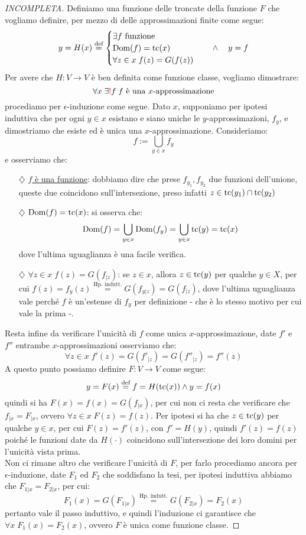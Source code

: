 \begin{proof}[INCOMPLETA]
	Definiamo una funzione delle troncate della funzione $F$ che vogliamo definire, per mezzo di delle approssimazioni finite come segue:
	\[ y = H(x) \overset{\text{def}}{=} \begin{cases}
		\text{$\exists f$ funzione} \\
		\operatorname{Dom}(f) = \operatorname{tc}(x) \\
		\forall z \in x \; f(z) = G(f(z))
	\end{cases} \quad \land \quad y = f
		\]
	Per avere che $H : V \to V$ è ben definita come funzione classe, vogliamo dimostrare:
	\[ \forall x \; \exists\textcolor{red}{!} f \;\text{$f$ è una $x$-approssimazione}
		\]
	procediamo per $\epsilon$-induzione come segue. Dato $x$, supponiamo per ipotesi induttiva che per ogni $y \in x$
	esistano e siano uniche le $y$-approssimazioni, $f_y$, e dimostriamo che esiste ed è unica una $x$-approssimazione.
	Consideriamo:
	\[ f := \bigcup_{y \in x}f_y
		\]	
	e osserviamo che:
	\begin{itemize}
		\item[$\diamondsuit$] \underline{$f$ è una funzione}: dobbiamo dire che prese $f_{y_1},f_{y_2}$ due funzioni dell'unione, queste due coincidono sull'intersezione, preso infatti $z \in \operatorname{tc}(y_1) \cap \operatorname{tc}(y_2)$
		\item[$\diamondsuit$] \underline{$\operatorname{Dom}(f) = \operatorname{tc}(x)$}: si osserva che:
		\[ \operatorname{Dom}(f) = \bigcup_{y \in x}\operatorname{Dom}(f_y) = \bigcup_{y \in x} \operatorname{tc}(y) = \operatorname{tc}(x)
			\]
		dove l'ultima uguaglianza è una facile verifica.
		\item[$\diamondsuit$] \underline{$\forall z \in x \; f(z) = G(f_{|z})$}: se $z \in x$, allora $z \in \operatorname{tc}(y)$ per qualche $y \in X$, per cui $f(z) = f_{y}(z) \overset{\text{Hp. indutt.}}{=} G(f_{y|z}) = G(f_{|z})$,
		dove l'ultima uguaglianza vale perché $f$ è un'estense di $f_y$ per definizione - che è lo stesso motivo per cui vale la prima -.
	\end{itemize}
	Resta infine da verificare l'unicità di $f$ come unica $x$-approssimazione, date $f'$ e $f''$ entrambe $x$-approssimazioni osserviamo che:
	\[ \forall z \in x \; f'(z) = G(f'_{|z}) = G(f''_{|z}) = f''(z)
		\]
	A questo punto possiamo definire $F : V \to V$ come segue:
	\[ y = F(x) \overset{\text{def}}{=} f = H(\operatorname{tc}(x)) \land y = f(x)
		\]
	quindi si ha $F(x) = f(x) = G(f_{|x})$, per cui non ci resta che verificare che $f_{|x} = F_{|x}$, ovvero $\forall z \in x \; F(z) = f(z)$.
	Per ipotesi si ha che $z \in \operatorname{tc}(y)$ per qualche $y \in x$, per cui $F(z) = f'(z)$, con $f' = H(y)$, quindi $f'(z) = f(z)$ poiché le funzioni date da $H(\cdot)$
	coincidono sull'intersezione dei loro domini per l'unicità vista prima.\\
	Non ci rimane altro che verificare l'unicità di $F$, per farlo procediamo ancora per $\epsilon$-induzione, date $F_1$ ed $F_2$ che soddisfano la tesi, per ipotesi induttiva abbiamo che $F_{1|x} = F_{2|x}$,
	per cui:
	\[ F_1(x) = G(F_{1|x}) \overset{\text{Hp. indutt.}}{=} G(F_{2|x}) = F_2(x)
		\]
	pertanto vale il passo induttivo, e quindi l'induzione ci garantisce che $\forall x \; F_1(x) = F_2(x)$, ovvero $F$ è unica come funzione classe.
\end{proof}